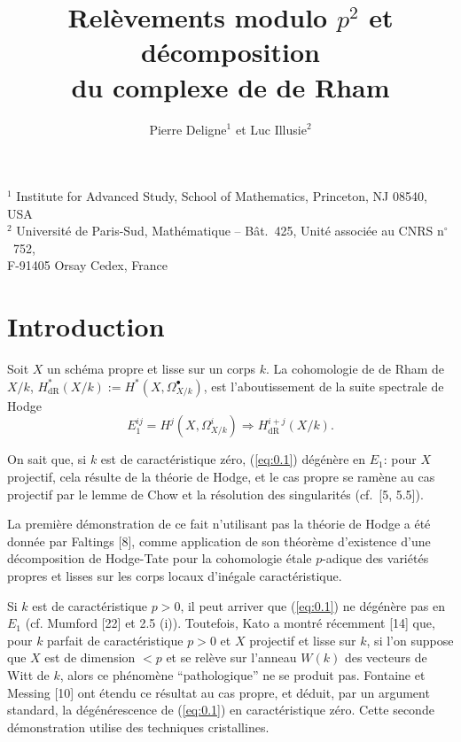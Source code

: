 \documentclass[12pt,a4paper]{article}
\title{\textbf{Rel\`evements modulo $p^2$ et d\'ecomposition\\du complexe de de Rham}}
\author{Pierre Deligne$^1$ et Luc Illusie$^2$}
\date{}
\theoremstyle{plain}
\theoremstyle{definition}
\theoremstyle{remark}
\newcommand{\dR}{\text{dR}}
\begin{document}
\maketitle

\begin{center}
$^1$ Institute for Advanced Study, School of Mathematics, Princeton, NJ 08540, USA\\
$^2$ Universit\'e de Paris-Sud, Math\'ematique -- B\^at.~425, Unit\'e associ\'ee au CNRS n$^\circ$~752,\\
F-91405 Orsay Cedex, France
\end{center}

\tableofcontents

\section*{Introduction}

Soit $X$ un sch\'ema propre et lisse sur un corps $k$. La cohomologie de de Rham de
$X/k$, $H^*_{\dR}(X/k) := H^*(X, \Omega^{\bullet}_{X/k})$, est l'aboutissement de la suite spectrale de Hodge
\begin{equation}\label{eq:0.1}
E_1^{ij} = H^j(X, \Omega^i_{X/k}) \Rightarrow H^{i+j}_{\dR}(X/k).
\end{equation}

On sait que, si $k$ est de caract\'eristique z\'ero, (\ref{eq:0.1}) d\'eg\'en\`ere en $E_1$: pour $X$
projectif, cela r\'esulte de la th\'eorie de Hodge, et le cas propre se ram\`ene au cas
projectif par le lemme de Chow et la r\'esolution des singularit\'es (cf.~[5, 5.5]).

La premi\`ere d\'emonstration de ce fait n'utilisant pas la th\'eorie de Hodge a \'et\'e
donn\'ee par Faltings [8], comme application de son th\'eor\`eme d'existence d'une
d\'ecomposition de Hodge-Tate pour la cohomologie \'etale $p$-adique des vari\'et\'es
propres et lisses sur les corps locaux d'in\'egale caract\'eristique.

Si $k$ est de caract\'eristique $p > 0$, il peut arriver que (\ref{eq:0.1}) ne d\'eg\'en\`ere pas en $E_1$ (cf.
Mumford [22] et 2.5 (i)). Toutefois, Kato a montr\'e r\'ecemment [14] que, pour $k$
parfait de caract\'eristique $p > 0$ et $X$ projectif et lisse sur $k$, si l'on suppose que $X$ est
de dimension $< p$ et se rel\`eve sur l'anneau $W(k)$ des vecteurs de Witt de $k$, alors ce
ph\'enom\`ene ``pathologique'' ne se produit pas. Fontaine et Messing [10] ont
\'etendu ce r\'esultat au cas propre, et d\'eduit, par un argument standard, la
d\'eg\'en\'erescence de (\ref{eq:0.1}) en caract\'eristique z\'ero. Cette seconde d\'emonstration
utilise des techniques cristallines.
\end{document}
